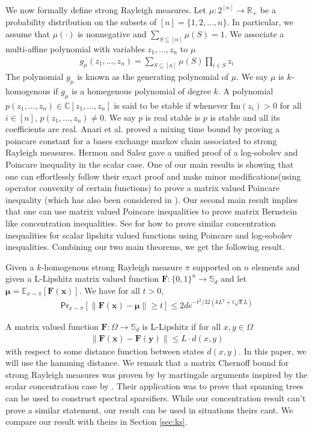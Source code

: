 We now formally define strong Rayleigh measures. Let $\mu : 2^{[n]}\rightarrow \mathbb{R}_{+}$ be a probability distribution on the subsets of $[n]=\{1,2,\ldots,n\}$. In particular, we assume that $\mu(\cdot)$ is nonnegative and $\sum\limits_{S \subseteq [n]}\mu(S)=1$. We associate a multi-affine polynomial with variables $z_1,\ldots,z_n$ to $\mu$
\begin{align*}
  g_\mu(z_1,\ldots,z_n)=\sum\limits_{S \subseteq [n]}\mu(S)\prod_{i\in S}z_i
\end{align*}
The polynomial $g_\mu$ is known as the generating polynomial of $\mu$. We say $\mu$ is $k$-homogenous if $g_\mu$ is a homegenous polynomial of degree $k$. A polynomial $p(z_1,\ldots,z_n)\in \mathbb{C}[z_1,\ldots,z_n]$ is said to be stable if whenever Im$(z_i)>0$ for all $i\in[n]$, $p(z_1,\ldots,z_n)\neq 0$. We say $p$ is real stable is $p$ is stable and all its coefficients are real.
Anari et al. \cite{AGR16} proved a mixing time bound by proving a poincare constant for a bases exchange markov chain associated to strong Rayleigh measures. Hermon and Salez\cite{HS19} gave a unified proof of a log-sobolev and Poincare inequality in the scalar case. One of our main results is showing that one can effortlessly follow their exact proof and make minor modifications(using operator convexity of certain functions) to prove a matrix valued Poincare inequality (which has also been considered in \cite{CHT15,CH15,CH16}). Our second main result implies that one can use matrix valued Poincare inequalities to prove matrix Bernstein like concentration inequalities. See \cite{Led} for how to prove similar concentration inequalities for scalar lipshitz valued functions using Poincare and log-sobolev inequalities. Combining our two main theorems, we get the following result.

\begin{theorem}\label{thm:srBern} Given a $k$-homogenous strong Rayleigh measure $\pi$ supported on $n$ elements and given a L-Lipshitz matrix valued function $\mathbf{F}:\{0,1\}^n\rightarrow\mathbb{S}_d$ and let $\mathbf{\mu}=\mathbb{E}_{x\sim\pi}[\mathbf{F(x)}]$. We have for all $t>0$,
  \begin{align*}
    \mathsf{Pr}_{x \sim \pi}[\|\mathbf{F(x)-\mathbf{\mu}}\|\geq t]\leq 2 de^{-t^2/32(kL^2 + t\sqrt{k}L)}
  \end{align*}
\end{theorem}
A matrix valued function $\mathbf{F}:\Omega\rightarrow \mathbb{S}_d$ is L-Lipshitz if for all $x,y \in \Omega$
\begin{align*}
  \|\mathbf{F(x)}-\mathbf{F(y)}\|\leq L\cdot d(x,y)
\end{align*}
with respect to some distance function between states $d(x,y)$. In this paper, we will use the hamming distance.
We remark that a matrix Chernoff bound for strong Rayleigh measures was proven by \cite{KyngSong18} by martingale arguments inspired by the scalar concentration case by \cite{PP14}. Their application was to prove that spanning trees can be used to construct spectral sparsifiers. While our concentration result can't prove a similar statement, our result can be used in situations theirs cant. We compare our result with theirs in Section \ref{sec:ks}.

